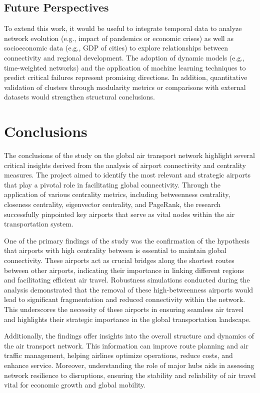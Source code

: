 \documentclass[12pt]{article}
\begin{document}
        \subsection{Future Perspectives}
            To extend this work, it would be useful to integrate temporal data to analyze network evolution (e.g., impact of pandemics or economic crises) as well as socioeconomic data (e.g., GDP of cities) to explore relationships between connectivity and regional development. The adoption of dynamic models (e.g., time-weighted networks) and the application of machine learning techniques to predict critical failures represent promising directions. In addition, quantitative validation of clusters through modularity metrics or comparisons with external datasets would strengthen structural conclusions.
            
        

    \section{Conclusions}\label{sec:conclusions}
    The conclusions of the study on the global air transport network highlight several critical insights derived from the analysis of airport connectivity and centrality measures. The project aimed to identify the most relevant and strategic airports that play a pivotal role in facilitating global connectivity. Through the application of various centrality metrics, including betweenness centrality, closeness centrality, eigenvector centrality, and PageRank, the research successfully pinpointed key airports that serve as vital nodes within the air transportation system.

    One of the primary findings of the study was the confirmation of the hypothesis that airports with high centrality between is essential to maintain global connectivity. These airports act as crucial bridges along the shortest routes between other airports, indicating their importance in linking different regions and facilitating efficient air travel. Robustness simulations conducted during the analysis demonstrated that the removal of these high-betweenness airports would lead to significant fragmentation and reduced connectivity within the network. This underscores the necessity of these airports in ensuring seamless air travel and highlights their strategic importance in the global transportation landscape.

    Additionally, the findings offer insights into the overall structure and dynamics of the air transport network. This information can improve route planning and air traffic management, helping airlines optimize operations, reduce costs, and enhance service. Moreover, understanding the role of major hubs aids in assessing network resilience to disruptions, ensuring the stability and reliability of air travel vital for economic growth and global mobility.
\end{document}
